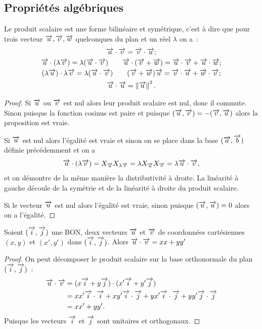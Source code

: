 \subsection{Propriétés algébriques}
\begin{prop}
  Le produit scalaire est une forme bilinéaire et symétrique, c'est à dire que pour trois vecteur \(\vu, \vv, \vw\) quelconques du plan et un réel \(\lambda\) on a~:
  \begin{gather}
    \vu \cdot \vv = \vv \cdot \vu;\\
    \vu \cdot (\lambda \vv) = \lambda (\vu\cdot \vv) \qquad \vu \cdot (\vv + \vw)=\vu \cdot \vv + \vu \cdot \vw;\\
    (\lambda \vu) \cdot \lambda \vv = \lambda (\vu \cdot \vv) \qquad (\vv + \vw) \vu=\vv \cdot \vu + \vw \cdot \vv;\\
    \vu \cdot \vu = \norme{\vu}^2.
  \end{gather}
\end{prop}
\begin{proof}
  Si \(\vu\) ou \(\vv\) est nul alors leur produit scalaire est nul, donc il commute. Sinon puisque la fonction cosinus est paire et puisque \((\vu,\vv)=-(\vv,\vu)\) alors la proposition est vraie.

  Si \(\vu\) est nul alors l'égalité est vraie et sinon on se place dans la base \((\vect{a},\vect{b})\) définie précédemment et on a 
  \begin{equation}
    \vu \cdot (\lambda \vv) = X_{\vu} X_{\lambda \vv}=\lambda X_{\vu} X_{\vv}=\lambda \vu \cdot \vv,
  \end{equation}
  et on démontre de la même manière la distributivité à droite. La linéarité à gauche découle de la symétrie et de la linéarité à droite du produit scalaire.
   
  Si le vecteur \(\vu\) est nul alors l'égalité est vraie, sinon puisque \((\vu,\vu)=0\) alors on a l'égalité.  
\end{proof}
\begin{prop}
  Soient \((\vi,\vj)\) une BON, deux vecteurs \(\vu\) et \(\vv\) de coordonnées cartésiennes \((x,y)\) et \((x',y')\) dans \((\vi,\vj)\). Alors \(\vu \cdot \vv=xx+yy'\)
\end{prop}
\begin{proof}
  On peut décomposer le produit scalaire sur la base orthonormale du plan \((\vi,\vj)\)~:
  \begin{align}
    \vu \cdot \vv &= (x \vi + y \vj) \cdot (x' \vi + y' \vj) \\
    &= x x' \vi \cdot \vi + xy' \vi \cdot \vj + yx' \vi \cdot \vj + yy' \vj \cdot \vj\\
    & = xx' +yy'.
  \end{align}
  Puisque les vecteurs \(\vi\) et \(\vj\) sont unitaires et orthogonaux.
\end{proof}
